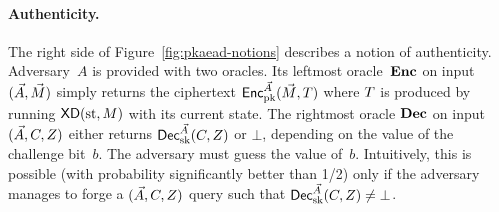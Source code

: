 
\paragraph{Authenticity. }  
The right side of Figure~\ref{fig:pkaead-notions} describes a notion of authenticity.  Adversary~$A$ is provided with two oracles.  Its leftmost oracle~$\textbf{Enc}$ on input $(\vec{A},\vec{M})$ simply returns the ciphertext ${\mathsf{Enc}}_{\mathrm{pk}}^{\vec{A}}(\vec{M},T)$ where $T$ is produced by running $\mathsf{XD}(\mathrm{st},M)$ with its current state.  The rightmost oracle $\textbf{Dec}$ on input $(\vec{A},C,Z)$ either returns ${\mathsf{Dec}}_{\mathrm{sk}}^{\vec{A}}(C,Z)$ or $\bot$, depending on the value of the challenge bit~$b$.  The adversary must guess the value of~$b$.  Intuitively, this is possible (with probability significantly better than 1/2) only if the adversary manages to forge a $(\vec{A},C,Z)$ query such that ${\mathsf{Dec}}_{\mathrm{sk}}^{\vec{A}}(C,Z) \neq \bot$.  


